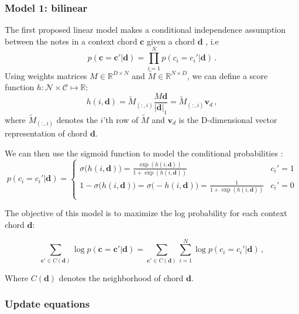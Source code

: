 \documentclass[12pt]{article}\pagestyle{myheadings}
\newcommand{\R}{\mathbb{R}}
\newcommand{\M}{\tilde{M}}
\newcommand{\boldc}{\boldsymbol c}
\newcommand{\boldd}{\boldsymbol d}
\newcommand{\boldvd}{\boldsymbol v_d}
\begin{document}
 
 \subsubsection{Model 1: bilinear}

The first proposed linear model makes a conditional independence assumption between the notes in a context chord $\boldc$ given a chord $\boldd$ , i.e 
\begin{equation}
p(\boldc =\boldc' | \boldd) = \prod_{i=1}^N  p(c_i =c_i'|  \boldd) \,.
\end{equation} 
Using weights matrices $M\in \R^{D \times N}$ and $\M\in \R^{N \times D}$, we can define a score function $h: \mathcal{N} \times \mathcal{C} \mapsto \mathbb{R} :$
\begin{equation}
h(i,\boldd) = \M_{(:,i)} \frac{M \boldd}{| \boldd |_1} =  \M_{(:,i)} \boldvd \,,
\end{equation}
where $\M_{(:,i)}$ denotes the $i$'th row of $\M$ and $\boldvd$ is the D-dimensional vector representation  of chord $\boldd$.

We can then use the sigmoid function to model the conditional probabilities :
\begin{equation}
p(c_i =c_i'|  \boldd) = \left\{
                \begin{array}{lll}
                  \sigma\big( h(i,\boldd) \big) = \frac{\exp(h(i,\boldd))}{1 + \exp(h(i,\boldd))} & c_i' = 1 \\
                  1- \sigma\big( h(i,\boldd) \big) = \sigma\big( - h(i,\boldd) \big) = \frac{1}{1 + \exp(h(i,\boldd))} & c_i' = 0\\
                \end{array}
              \right.
\end{equation}


The objective of this model is to maximize the log probability for each context chord $\boldd$:

\begin{equation}
\sum_{\boldc' \in C(\boldd)} \log p(\boldc = \boldc'|\boldd)
=  \sum_{\boldc' \in C(\boldd)} \sum_{i=1}^N \log p(c_i = c_i'|  \boldd) \,,
\label{eq:c2v_obj}
\end{equation}

Where $C(\boldd)$ denotes the neighborhood of chord $\boldd$.

\subsubsection*{Update equations}
\end{document}

